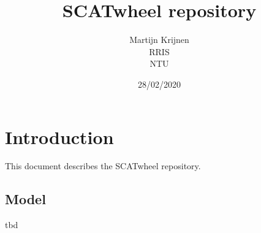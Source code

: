 \documentclass[a4paper,10pt]{article}
\begin{document}
\title{SCATwheel repository}



\author{Martijn Krijnen \\
RRIS \\
NTU \\
}
\date{28/02/2020}

\maketitle



\section{Introduction}
This document describes the SCATwheel repository.

\subsection{Model}
tbd 



\end{document}
